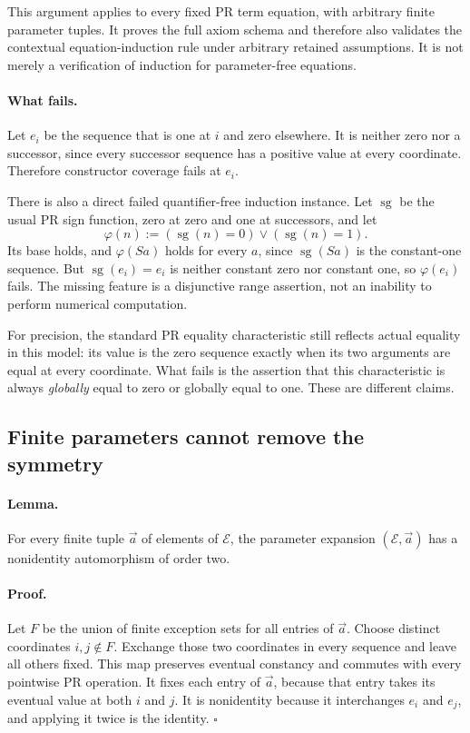This argument applies to every fixed PR term equation, with arbitrary
finite parameter tuples.  It proves the full axiom schema and therefore
also validates the contextual equation-induction rule under arbitrary
retained assumptions.  It is not merely a verification of induction
for parameter-free equations.

\paragraph{What fails.}
Let $e_i$ be the sequence that is one at $i$ and zero elsewhere.
It is neither zero nor a successor, since every successor sequence has
a positive value at every coordinate.  Therefore constructor coverage
fails at $e_i$.

There is also a direct failed quantifier-free induction instance.  Let
$\operatorname{sg}$ be the usual PR sign function, zero at zero and
one at successors, and let
\[
 \varphi(n):=
   (\operatorname{sg}(n)=0)\lor(\operatorname{sg}(n)=1).
\]
Its base holds, and $\varphi(Sa)$ holds for every $a$, since
$\operatorname{sg}(Sa)$ is the constant-one sequence.  But
$\operatorname{sg}(e_i)=e_i$ is neither constant zero nor constant one,
so $\varphi(e_i)$ fails.  The missing feature is a disjunctive range
assertion, not an inability to perform numerical computation.

For precision, the standard PR equality characteristic still reflects
actual equality in this model: its value is the zero sequence exactly
when its two arguments are equal at every coordinate.  What fails is
the assertion that this characteristic is always \emph{globally}
equal to zero or globally equal to one.  These are different claims.

\subsection{Finite parameters cannot remove the symmetry}

\paragraph{Lemma.}
For every finite tuple $\vec a$ of elements of $\mathcal E$, the
parameter expansion $(\mathcal E,\vec a)$ has a nonidentity
automorphism of order two.

\paragraph{Proof.}
Let $F$ be the union of finite exception sets for all entries of
$\vec a$.  Choose distinct coordinates $i,j\notin F$.  Exchange those
two coordinates in every sequence and leave all others fixed.  This
map preserves eventual constancy and commutes with every pointwise PR
operation.  It fixes each entry of $\vec a$, because that entry takes
its eventual value at both $i$ and $j$.  It is nonidentity because it
interchanges $e_i$ and $e_j$, and applying it twice is the identity.
\hfill$\square$

